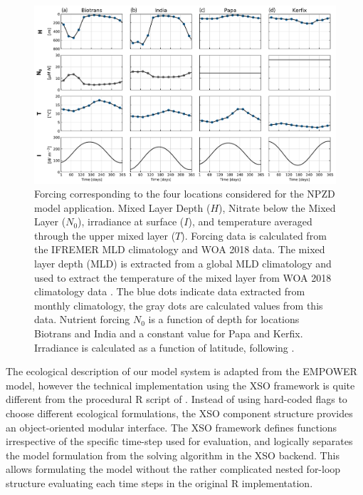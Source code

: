 \documentclass[gmd, manuscript]{copernicus}
\begin{document}
\begin{figure}[t]
\includegraphics[width=15cm]{Figures/firstdraft_plots/02_EMPOWER_forcing.pdf}
\caption{Forcing corresponding to the four locations considered for the NPZD model application. Mixed Layer Depth ($H$), Nitrate below the Mixed Layer ($N_0$), irradiance at surface ($I$), and temperature averaged through the upper mixed layer ($T$). Forcing data is calculated from the IFREMER MLD climatology and WOA 2018 data. The mixed layer depth (MLD) is extracted from a global MLD climatology \citep{DeBoyer2022} and used to extract the temperature of the mixed layer from WOA 2018 climatology data \citep{Garcia2019WORLDSilicate}. The blue dots indicate data extracted from monthly climatology, the gray dots are calculated values from this data. Nutrient forcing $N_0$ is a function of depth for locations Biotrans and India and a constant value for Papa and Kerfix. Irradiance is calculated as a function of latitude, following \citet{Anderson2015c}.}
\label{Figure:EMPOWERforcing}
\end{figure}

The ecological description of our model system is adapted from the EMPOWER model, however the technical implementation using the XSO framework is quite different from the procedural R script of \citet{Anderson2015c}. Instead of using hard-coded flags to choose different ecological formulations, the XSO component structure provides an object-oriented modular interface. The XSO framework defines functions irrespective of the specific time-step used for evaluation, and logically separates the model formulation from the solving algorithm in the XSO backend. This allows formulating the model without the rather complicated nested for-loop structure evaluating each time steps in the original R implementation.
\end{document}

